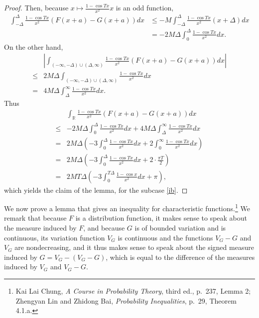 \documentclass{article}
\theoremstyle{definition}
\begin{document}
\begin{proof}
Then, because $x \mapsto \frac{1-\cos Tx}{x^2} x$ is an odd function,
\begin{align*}
\int_{-\Delta}^\Delta \frac{1-\cos Tx}{x^2} (F(x+a)-G(x+a)) dx&\leq -M \int_{-\Delta}^\Delta \frac{1-\cos Tx}{x^2}
(x+\Delta) dx\\
&=-2M\Delta \int_0^\Delta \frac{1-\cos Tx}{x^2} dx. 
\end{align*}
On the other hand,
\[
\begin{split}
&\left|\int_{(-\infty,-\Delta) \cup (\Delta,\infty)}
\frac{1-\cos Tx}{x^2} (F(x+a)-G(x+a)) dx\right|\\
\leq&2M \Delta \int_{(-\infty,-\Delta) \cup (\Delta,\infty)} \frac{1-\cos Tx}{x^2} dx\\
=&4M\Delta \int_\Delta^\infty  \frac{1-\cos Tx}{x^2} dx.
\end{split}
\]
Thus
\[
\begin{split}
&\int_\mathbb{R} \frac{1-\cos Tx}{x^2} (F(x+a)-G(x+a)) dx\\
\leq& -2M\Delta \int_0^\Delta \frac{1-\cos Tx}{x^2} dx
+4M\Delta \int_\Delta^\infty  \frac{1-\cos Tx}{x^2} dx\\
=&2M\Delta \left(-3\int_0^\Delta \frac{1-\cos Tx}{x^2} dx
+2\int_0^\infty \frac{1-\cos Tx}{x^2} dx\right)\\
=&2M\Delta \left(-3\int_0^\Delta \frac{1-\cos Tx}{x^2} dx + 2 \cdot \frac{\pi T}{2} \right)\\
=&2M T \Delta \left(-3 \int_0^{T\Delta} \frac{1-\cos x}{x^2} dx +\pi\right),
\end{split}
\]
which yields the claim of the lemma, for the subcase \eqref{ib}.
\end{proof}


We now prove a lemma that gives an inequality for characteristic functions.\footnote{Kai Lai Chung,
{\em A Course in Probability Theory}, third ed.,
p.~237, Lemma 2;
Zhengyan Lin and Zhidong Bai, {\em Probability Inequalities}, p.~29, Theorem 4.1.a.}
We remark that because $F$ is a distribution function,
it makes sense to speak about the  measure induced by $F$, and because $G$ is of bounded variation and is continuous,
its variation function  $V_G$ is continuous and the functions $V_G-G$ and $V_G$ are nondecreasing,
and it thus makes sense to speak about the signed measure induced by $G=V_G-(V_G-G)$, which is
equal to the difference of the  measures induced by $V_G$ and $V_G-G$.
\end{document}
